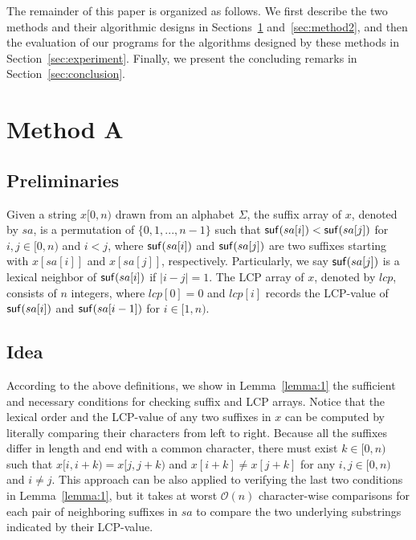 \documentclass[10pt,journal,compsoc]{IEEEtran}
\begin{document}
The remainder of this paper is organized as follows. We first describe the two methods and their algorithmic designs in Sections~\ref{sec:method1} and~\ref{sec:method2}, and then the evaluation of our programs for the algorithms designed by these methods in Section~\ref{sec:experiment}. Finally, we present the concluding remarks in Section~\ref{sec:conclusion}. 



\section{Method A} \label{sec:method1}


\subsection{Preliminaries} \label{sec:method1:notations}

Given a string $x[0, n)$ drawn from an alphabet $\Sigma$, the suffix array of $x$, denoted by $sa$, is a permutation of $\{0, 1, ..., n - 1\}$ such that ${\sf suf}(sa[i]) < {\sf suf}(sa[j])$ for $i, j \in [0, n)$ and $i < j$, where ${\sf suf}(sa[i])$ and ${\sf suf}(sa[j])$ are two suffixes starting with $x[sa[i]]$ and $x[sa[j]]$, respectively. Particularly, we say ${\sf suf}(sa[j])$ is a lexical neighbor of ${\sf suf}(sa[i])$ if $|i - j| = 1$. The LCP array of $x$, denoted by $lcp$, consists of $n$ integers, where $lcp[0]=0$ and $lcp[i]$ records the LCP-value of ${\sf suf}(sa[i])$ and ${\sf suf}(sa[i - 1])$ for $i \in [1, n)$. 

\subsection{Idea} \label{sec:method1:idea}

According to the above definitions, we show in Lemma~\ref{lemma:1} the sufficient and necessary conditions for checking suffix and LCP arrays. Notice that the lexical order and the LCP-value of any two suffixes in $x$ can be computed by literally comparing their characters from left to right. Because all the suffixes differ in length and end with a common character, there must exist $k \in [0, n)$ such that $x[i, i + k) = x[j, j + k)$ and $x[i + k] \ne x[j + k]$ for any $i, j \in [0, n)$ and $i \ne j$. This approach can be also applied to verifying the last two conditions in Lemma~\ref{lemma:1}, but it takes at worst $\mathcal{O}(n)$ character-wise comparisons for each pair of neighboring suffixes in $sa$ to compare the two underlying substrings indicated by their LCP-value.
\end{document}
